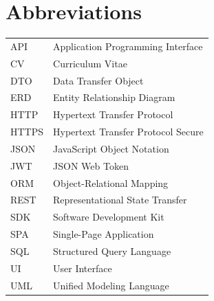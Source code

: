 \chapter*{Abbreviations}

\begin{tabular}{ll}
	API & Application Programming Interface\\
	CV & Curriculum Vitae\\
	DTO & Data Transfer Object\\
	ERD & Entity Relationship Diagram\\
	HTTP & Hypertext Transfer Protocol\\
	HTTPS & Hypertext Transfer Protocol Secure\\
	JSON & JavaScript Object Notation\\
	JWT & JSON Web Token\\
	ORM & Object-Relational Mapping\\
	REST & Representational State Transfer\\
	SDK & Software Development Kit\\
	SPA & Single-Page Application\\
	SQL & Structured Query Language\\
	UI & User Interface\\
	UML & Unified Modeling Language\\
\end{tabular}

